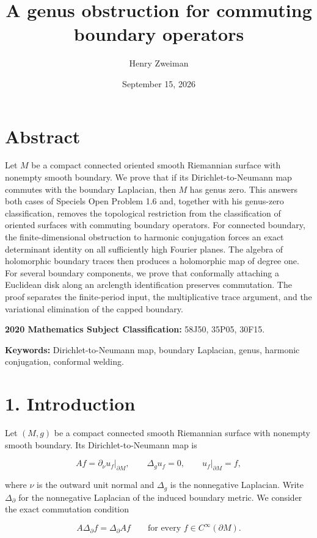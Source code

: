 \documentclass[11pt]{article}
\title{A genus obstruction for commuting boundary operators}
\author{Henry Zweiman}
\date{September 15, 2026}
\begin{document}
\maketitle
\section{Abstract}\label{abstract}

Let \(M\) be a compact connected oriented smooth Riemannian surface with
nonempty smooth boundary. We prove that if its Dirichlet-to-Neumann map
commutes with the boundary Laplacian, then \(M\) has genus zero. This
answers both cases of Speciel\textquotesingle s Open Problem 1.6 and,
together with his genus-zero classification, removes the topological
restriction from the classification of oriented surfaces with commuting
boundary operators. For connected boundary, the finite-dimensional
obstruction to harmonic conjugation forces an exact determinant identity
on all sufficiently high Fourier planes. The algebra of holomorphic
boundary traces then produces a holomorphic map of degree one. For
several boundary components, we prove that conformally attaching a
Euclidean disk along an arclength identification preserves commutation.
The proof separates the finite-period input, the multiplicative trace
argument, and the variational elimination of the capped boundary.

\textbf{2020 Mathematics Subject Classification:} 58J50, 35P05, 30F15.

\textbf{Keywords:} Dirichlet-to-Neumann map, boundary Laplacian, genus,
harmonic conjugation, conformal welding.

\section{1. Introduction}\label{introduction}

Let \((M,g)\) be a compact connected smooth Riemannian surface with
nonempty smooth boundary. Its Dirichlet-to-Neumann map is

\[
Af=\partial_\nu u_f\big|_{\partial M},\qquad
\Delta_g u_f=0,\qquad u_f\big|_{\partial M}=f,
\tag{1.1}
\]

where \(\nu\) is the outward unit normal and \(\Delta_g\) is the
nonnegative Laplacian. Write \(\Delta_\partial\) for the nonnegative
Laplacian of the induced boundary metric. We consider the exact
commutation condition

\[
A\Delta_\partial f=\Delta_\partial Af
\qquad\text{for every }f\in C^\infty(\partial M).
\tag{1.2}
\]
\end{document}
